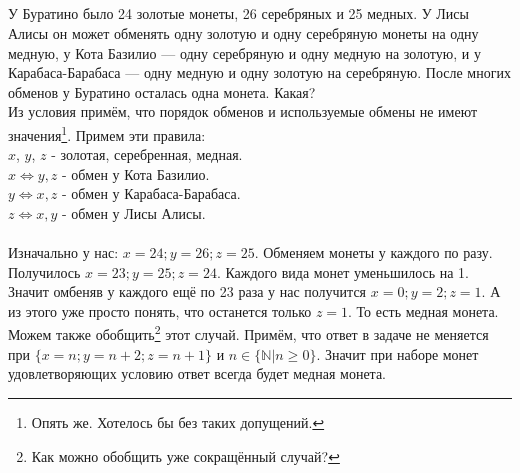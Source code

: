 \documentclass[a4paper,12pt]{article} %
\begin{document}
	\subsection{}{У Буратино было 24 золотые монеты, 26 серебряных и 25 медных. У Лисы Алисы он может обменять одну золотую и одну серебряную монеты на одну медную, у Кота Базилио — одну серебряную и одну медную на золотую, и у Карабаса-Барабаса — одну медную и одну золотую на серебряную. После многих обменов у Буратино осталась одна монета. Какая?\\
		
		Из условия примём, что порядок обменов и используемые обмены не имеют значения\footnote{Опять же. Хотелось бы без таких допущений.}. Примем эти правила:\\
		$x$, $y$, $z$ - золотая, серебренная, медная.\\
		$x \Leftrightarrow y, z$ - обмен у Кота Базилио.\\
		$y \Leftrightarrow x, z$ - обмен у Карабаса-Барабаса.\\
		$z \Leftrightarrow x, y$ - обмен у Лисы Алисы.\\\\
		Изначально у нас: $x=24; y=26; z=25$. Обменяем монеты у каждого по разу. Получилось $x=23; y=25; z=24$. Каждого вида монет уменьшилось на 1. Значит омбеняв у каждого ещё по 23 раза у нас получится $x=0; y=2; z=1$. А из этого уже просто понять, что останется только $z=1$. То есть медная монета. \\ Можем также обобщить\footnote{Как можно обобщить уже сокращённый случай?} этот случай. Примём, что ответ в задаче не меняется при $\{x=n; y=n+2; z=n+1\}$ и $n\in\{\mathbb N | n \geqslant 0\}$. Значит при наборе монет удовлетворяющих условию ответ всегда будет медная монета.
	}
\end{document}
